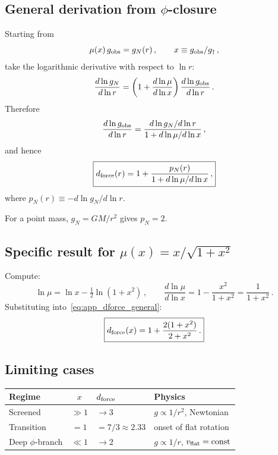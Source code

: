 \documentclass[11pt,a4paper]{article}
\numberwithin{equation}{section}
\begin{document}
\subsection{General derivation from $\phi$-closure}

Starting from
\begin{equation}
\mu(x)\,g_{\rm obs} = g_N(r)\,,
\qquad x \equiv g_{\rm obs}/g_\dagger\,,
\end{equation}
take the logarithmic derivative with respect to $\ln r$:
\begin{equation}
\frac{d\ln g_N}{d\ln r}
= \left(1 + \frac{d\ln\mu}{d\ln x}\right)
  \frac{d\ln g_{\rm obs}}{d\ln r}\,.
\end{equation}
Therefore
\begin{equation}
\frac{d\ln g_{\rm obs}}{d\ln r}
= \frac{d\ln g_N/d\ln r}
       {1 + d\ln\mu/d\ln x}\,,
\end{equation}
and hence
\begin{equation}
\boxed{
d_{\rm force}(r)
= 1 + \frac{p_N(r)}{1 + d\ln\mu/d\ln x}\,,
}
\label{eq:app_dforce_general}
\end{equation}
where $p_N(r) \equiv -d\ln g_N/d\ln r$.

For a point mass, $g_N = GM/r^2$ gives $p_N = 2$.

\subsection{Specific result for $\mu(x) = x/\sqrt{1+x^2}$}

Compute:
\begin{equation}
\ln\mu = \ln x - \tfrac{1}{2}\ln(1+x^2)\,,
\qquad
\frac{d\ln\mu}{d\ln x}
= 1 - \frac{x^2}{1+x^2}
= \frac{1}{1+x^2}\,.
\end{equation}
Substituting into~\eqref{eq:app_dforce_general}:
\begin{equation}
\boxed{
d_{\rm force}(x)
= 1 + \frac{2(1+x^2)}{2+x^2}\,.
}
\label{eq:app_dforce_closed}
\end{equation}

\subsection{Limiting cases}

\begin{tabular}{lcll}
\hline
Regime & $x$ & $d_{\rm force}$ & Physics \\
\hline
Screened & $\gg 1$ & $\to 3$ &
  $g \propto 1/r^2$, Newtonian \\
Transition & $= 1$ & $= 7/3 \approx 2.33$ &
  onset of flat rotation \\
Deep $\phi$-branch & $\ll 1$ & $\to 2$ &
  $g \propto 1/r$, $v_{\rm flat} = \mathrm{const}$ \\
\hline
\end{tabular}
\end{document}
